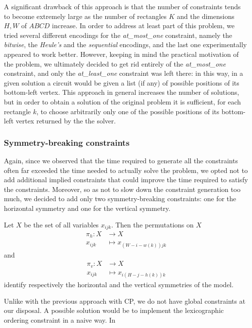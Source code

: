 \documentclass[]{article}
\begin{document}
A significant drawback of this approach is that the number of constraints tends to become extremely large as the number of rectangles $K$ and the dimensions $H, W$ of $ABCD$ increase. In order to address at least part of this problem, we tried several different encodings for the \emph{at\_most\_one} constraint, namely the \emph{bitwise}, the \emph{Heule's} and the \emph{sequential} encodings, and the last one experimentally appeared to work better. However, keeping in mind the practical motivation of the problem, we ultimately decided to get rid entirely of the \emph{at\_most\_one} constraint, and only the \emph{at\_least\_one} constraint was left there: in this way, in a given solution a circuit would be given a list (if any) of possible positions of its bottom-left vertex. This approach in general increases the number of solutions, but in order to obtain a solution of the original problem it is sufficient, for each rectangle $k$, to choose arbitrarily only one of the possible positions of its bottom-left vertex returned by the the solver.

\subsubsection{Symmetry-breaking constraints}
Again, since we observed that the time required to generate all the constraints often far exceeded the time needed to actually solve the problem, we opted not to add additional implied constraints that could improve the time required to satisfy the constraints. Moreover, so as not to slow down the constraint generation too much, we decided to add only two symmetry-breaking constraints: one for the horizontal symmetry and one for the vertical symmetry. 

Let $X$ be the set of all variables $x_{ijk}$. Then the permutations on $X$ 
\begin{align*}
	\pi_h \colon X & \longrightarrow X \\
	x_{ijk} & \longmapsto x_{(W-i-w(k))jk}
\end{align*}
and 
\begin{align*}
	\pi_v \colon X & \longrightarrow X \\
	x_{ijk} & \longmapsto x_{i(H-j-h(k))k}
\end{align*}
identify respectively the horizontal and the vertical symmetries of the model. 

Unlike with the previous approach with CP, we do not have global constraints at our disposal. A possible solution would be to implement the lexicographic ordering constraint in a naive way. In
\end{document}
